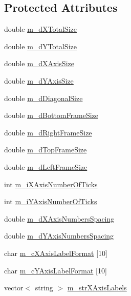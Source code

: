 \subsection*{Protected Attributes}
\begin{DoxyCompactItemize}
\item 
double \hyperlink{class_c_plot2_d_a6aa5e4fe6454dce99c5c04de04c2fdbd}{m\-\_\-d\-X\-Total\-Size}
\item 
double \hyperlink{class_c_plot2_d_ac91d1e4488ee754c6695c4882b8ffe47}{m\-\_\-d\-Y\-Total\-Size}
\item 
double \hyperlink{class_c_plot2_d_a9468ed46a8495be7ea2486e2903a3215}{m\-\_\-d\-X\-Axis\-Size}
\item 
double \hyperlink{class_c_plot2_d_acd9184665f0dd2c0afbf367cf6dc3f4b}{m\-\_\-d\-Y\-Axis\-Size}
\item 
double \hyperlink{class_c_plot2_d_ad56d5690e77e9848905f629f35946e9c}{m\-\_\-d\-Diagonal\-Size}
\item 
double \hyperlink{class_c_plot2_d_ab5673a2c1e5497866a397e2c2be02c64}{m\-\_\-d\-Bottom\-Frame\-Size}
\item 
double \hyperlink{class_c_plot2_d_a9b6aaeeb92dd7e9305baeec0cdf3e63c}{m\-\_\-d\-Right\-Frame\-Size}
\item 
double \hyperlink{class_c_plot2_d_a75bc80e91708e1aab4794a09d1845241}{m\-\_\-d\-Top\-Frame\-Size}
\item 
double \hyperlink{class_c_plot2_d_ad8e440649c61deff279fcd87f3cff18a}{m\-\_\-d\-Left\-Frame\-Size}
\item 
int \hyperlink{class_c_plot2_d_a89e9d691cf26e50bb3e534173bfbc569}{m\-\_\-i\-X\-Axis\-Number\-Of\-Ticks}
\item 
int \hyperlink{class_c_plot2_d_a74edcbb4ea8bd87bfb8ef341395189cf}{m\-\_\-i\-Y\-Axis\-Number\-Of\-Ticks}
\item 
double \hyperlink{class_c_plot2_d_a1f1e193e662c12f604f286583ed96b39}{m\-\_\-d\-X\-Axis\-Numbers\-Spacing}
\item 
double \hyperlink{class_c_plot2_d_a1da4a09b339259f8123539a470be2d3b}{m\-\_\-d\-Y\-Axis\-Numbers\-Spacing}
\item 
char \hyperlink{class_c_plot2_d_ad3c1c668b0535a344006b9510037ae7e}{m\-\_\-c\-X\-Axis\-Label\-Format} \mbox{[}10\mbox{]}
\item 
char \hyperlink{class_c_plot2_d_acce78a82ddf2f28b79a778bfa30e02dd}{m\-\_\-c\-Y\-Axis\-Label\-Format} \mbox{[}10\mbox{]}
\item 
vector$<$ string $>$ \hyperlink{class_c_plot2_d_a36fd007d7a5c0864fd0b5fdd3de6d9e3}{m\-\_\-str\-X\-Axis\-Labels}

\end{DoxyCompactItemize}
